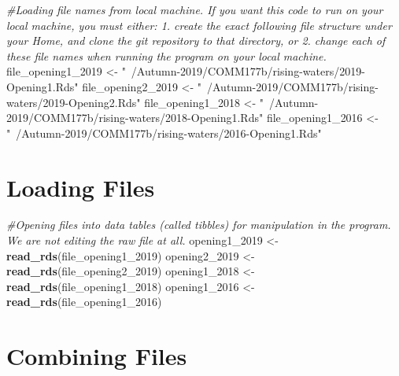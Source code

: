 \documentclass[]{article}
\newenvironment{Shaded}{\begin{snugshade}}{\end{snugshade}}
\newcommand{\CommentTok}[1]{\textcolor[rgb]{0.56,0.35,0.01}{\textit{#1}}}
\newcommand{\DecValTok}[1]{\textcolor[rgb]{0.00,0.00,0.81}{#1}}
\newcommand{\KeywordTok}[1]{\textcolor[rgb]{0.13,0.29,0.53}{\textbf{#1}}}
\newcommand{\NormalTok}[1]{#1}
\newcommand{\StringTok}[1]{\textcolor[rgb]{0.31,0.60,0.02}{#1}}
\begin{document}
\begin{Shaded}
\begin{Highlighting}[]
\CommentTok{#Loading file names from local machine. If you want this code to run on your local machine, you must either: 1. create the exact following file structure under your Home, and clone the git repository to that directory, or 2. change each of these file names when running the program on your local machine.}
\NormalTok{file_opening1_}\DecValTok{2019}\NormalTok{ <-}\StringTok{ "~/Autumn-2019/COMM177b/rising-waters/2019-Opening1.Rds"}
\NormalTok{file_opening2_}\DecValTok{2019}\NormalTok{ <-}\StringTok{ "~/Autumn-2019/COMM177b/rising-waters/2019-Opening2.Rds"}
\NormalTok{file_opening1_}\DecValTok{2018}\NormalTok{ <-}\StringTok{ "~/Autumn-2019/COMM177b/rising-waters/2018-Opening1.Rds"}
\NormalTok{file_opening1_}\DecValTok{2016}\NormalTok{ <-}\StringTok{ "~/Autumn-2019/COMM177b/rising-waters/2016-Opening1.Rds"}
\end{Highlighting}
\end{Shaded}

\hypertarget{loading-files}{%
\section{Loading Files}\label{loading-files}}

\begin{Shaded}
\begin{Highlighting}[]
\CommentTok{#Opening files into data tables (called tibbles) for manipulation in the program. We are not editing the raw file at all.}
\NormalTok{opening1_}\DecValTok{2019}\NormalTok{ <-}\StringTok{ }\KeywordTok{read_rds}\NormalTok{(file_opening1_}\DecValTok{2019}\NormalTok{)}
\NormalTok{opening2_}\DecValTok{2019}\NormalTok{ <-}\StringTok{ }\KeywordTok{read_rds}\NormalTok{(file_opening2_}\DecValTok{2019}\NormalTok{)}
\NormalTok{opening1_}\DecValTok{2018}\NormalTok{ <-}\StringTok{ }\KeywordTok{read_rds}\NormalTok{(file_opening1_}\DecValTok{2018}\NormalTok{)}
\NormalTok{opening1_}\DecValTok{2016}\NormalTok{ <-}\StringTok{ }\KeywordTok{read_rds}\NormalTok{(file_opening1_}\DecValTok{2016}\NormalTok{)}
\end{Highlighting}
\end{Shaded}

\hypertarget{combining-files}{%
\section{Combining Files}\label{combining-files}}
\end{document}
